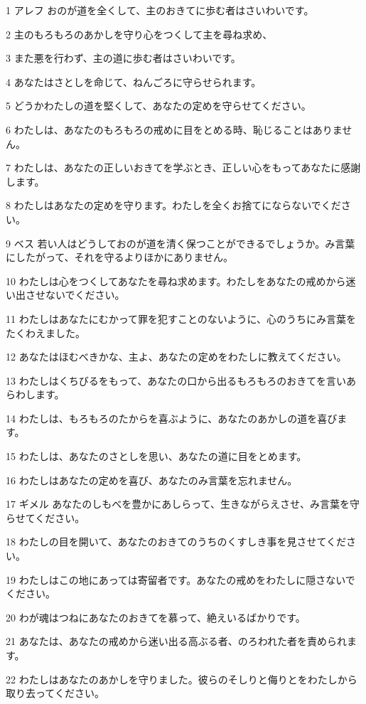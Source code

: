 \par 1 アレフ おのが道を全くして、主のおきてに歩む者はさいわいです。
\par 2 主のもろもろのあかしを守り心をつくして主を尋ね求め、
\par 3 また悪を行わず、主の道に歩む者はさいわいです。
\par 4 あなたはさとしを命じて、ねんごろに守らせられます。
\par 5 どうかわたしの道を堅くして、あなたの定めを守らせてください。
\par 6 わたしは、あなたのもろもろの戒めに目をとめる時、恥じることはありません。
\par 7 わたしは、あなたの正しいおきてを学ぶとき、正しい心をもってあなたに感謝します。
\par 8 わたしはあなたの定めを守ります。わたしを全くお捨てにならないでください。
\par 9 ベス 若い人はどうしておのが道を清く保つことができるでしょうか。み言葉にしたがって、それを守るよりほかにありません。
\par 10 わたしは心をつくしてあなたを尋ね求めます。わたしをあなたの戒めから迷い出させないでください。
\par 11 わたしはあなたにむかって罪を犯すことのないように、心のうちにみ言葉をたくわえました。
\par 12 あなたはほむべきかな、主よ、あなたの定めをわたしに教えてください。
\par 13 わたしはくちびるをもって、あなたの口から出るもろもろのおきてを言いあらわします。
\par 14 わたしは、もろもろのたからを喜ぶように、あなたのあかしの道を喜びます。
\par 15 わたしは、あなたのさとしを思い、あなたの道に目をとめます。
\par 16 わたしはあなたの定めを喜び、あなたのみ言葉を忘れません。
\par 17 ギメル あなたのしもべを豊かにあしらって、生きながらえさせ、み言葉を守らせてください。
\par 18 わたしの目を開いて、あなたのおきてのうちのくすしき事を見させてください。
\par 19 わたしはこの地にあっては寄留者です。あなたの戒めをわたしに隠さないでください。
\par 20 わが魂はつねにあなたのおきてを慕って、絶えいるばかりです。
\par 21 あなたは、あなたの戒めから迷い出る高ぶる者、のろわれた者を責められます。
\par 22 わたしはあなたのあかしを守りました。彼らのそしりと侮りとをわたしから取り去ってください。
